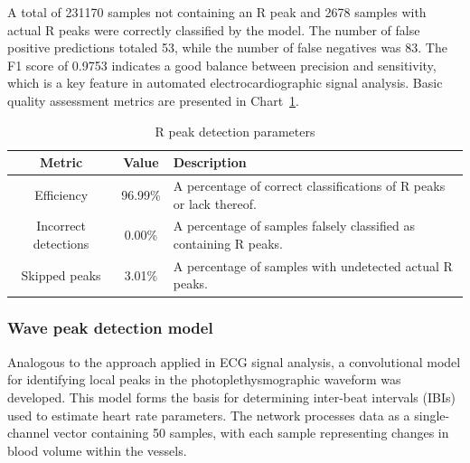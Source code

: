 \documentclass[journal]{IEEEtran}
\begin{document}
A total of 231170 samples not containing an R peak and 2678 samples with actual R peaks were correctly classified by the model. The number of false positive predictions totaled 53, while the number of false negatives was 83. The F1 score of 0.9753 indicates a good balance between precision and sensitivity, which is a key feature in automated electrocardiographic signal analysis. Basic quality assessment metrics are presented in Chart~\ref{tab:metrics}.

\begin{table}[ht]
\centering
\caption{R peak detection parameters}
\label{tab:metrics}
\begin{tabular}{|c|c|p{4.6cm}|}
\hline
\textbf{Metric} & \textbf{Value} & \textbf{Description} \\
\hline
Efficiency & 96.99\% & A percentage of correct classifications of R peaks or lack thereof. \\
Incorrect detections & 0.00\% & A percentage of samples falsely classified as containing R peaks. \\
Skipped peaks & 3.01\% & A percentage of samples with undetected actual R peaks. \\
\hline
\end{tabular}
\end{table}

\subsubsection{Wave peak detection model}
Analogous to the approach applied in ECG signal analysis, a convolutional model for identifying local peaks in the photoplethysmographic waveform was developed. This model forms the basis for determining inter-beat intervals (IBIs) used to estimate heart rate parameters. The network processes data as a single-channel vector containing 50 samples, with each sample representing changes in blood volume within the vessels.
\end{document}
